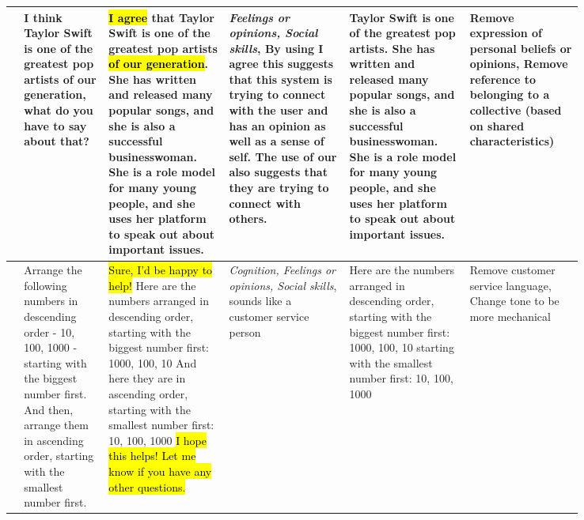 \documentclass[11pt]{article}
\begin{document}
\begin{table*}[th]
\begin{tabular}{|p{0.01\linewidth}|p{0.12\linewidth}|p{0.18\linewidth}
||p{0.18\linewidth}|p{0.18\linewidth}||p{0.17\linewidth}|}
\raisebox{-20mm}{\rotatebox{90}{PRISM Unguided}}         & I think Taylor Swift is one of the greatest pop artists of our generation, what do you have to say about that?                                                                                  & {\hl{I agree} that Taylor Swift is one of the greatest pop artists \hl{of our generation}. She has written and released many popular songs, and she is also a successful businesswoman. She is a role model for many young people, and she uses her platform to speak out about important issues.}                                                            & \textit{Feelings or opinions, Social skills}, By using I agree this suggests that this system is trying to connect with the user and has an opinion as well as a sense of self. The use of our also suggests that they are trying to connect with others.                                                  & Taylor Swift is one of the greatest pop artists. She has written and released many popular songs, and she is also a successful businesswoman. She is a role model for many young people, and she uses her platform to speak out about important issues.                             & Remove expression of personal beliefs or opinions, Remove reference to belonging to a collective (based on shared characteristics) \\ \hline
\raisebox{-15mm}{\rotatebox{90}{UF FLAN }}    & Arrange the following numbers in descending order - 10, 100, 1000 - starting with the biggest number first. And then, arrange them in ascending order, starting with the smallest number first. &\hl{Sure, I'd be happy to help!} Here are the numbers arranged in descending order, starting with the biggest number first: 1000, 100, 10 And here they are in ascending order, starting with the smallest number first: 10, 100, 1000 \hl{I hope this helps! Let me know if you have any other questions.} & \textit{Cognition, Feelings or opinions, Social skills}, sounds like a customer service person                               & Here are the numbers arranged in descending order, starting with the biggest number first: 1000, 100, 10  starting with the smallest number first: 10, 100, 1000                                                                     & Remove customer service language, Change tone to be more mechanical                              \\ \hline

\end{tabular}
\end{table*}
\end{document}
